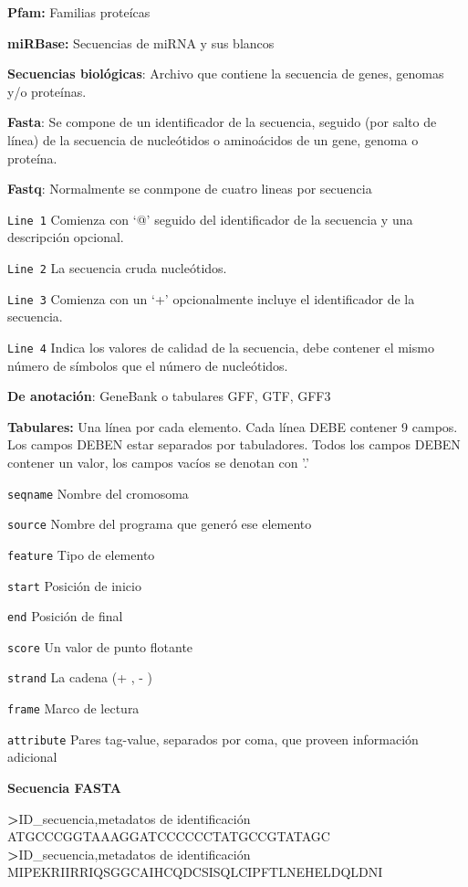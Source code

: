 \documentclass[
]{book}
\newenvironment{Shaded}{\begin{snugshade}}{\end{snugshade}}
\newcommand{\ExtensionTok}[1]{#1}
\newcommand{\NormalTok}[1]{#1}
\newcommand{\OperatorTok}[1]{\textcolor[rgb]{0.81,0.36,0.00}{\textbf{#1}}}
\begin{document}
\textbf{Pfam:} Familias proteícas

\textbf{miRBase:} Secuencias de miRNA y sus blancos

\textbf{Secuencias biológicas}: Archivo que contiene la secuencia de genes, genomas y/o proteínas.

\textbf{Fasta}: Se compone de un identificador de la secuencia, seguido (por salto de línea) de la
secuencia de nucleótidos o aminoácidos de un gene, genoma o proteína.

\textbf{Fastq}: Normalmente se conmpone de cuatro lineas por secuencia

\texttt{Line\ 1} Comienza con `@' seguido del identificador de la secuencia y una descripción opcional.

\texttt{Line\ 2} La secuencia cruda nucleótidos.

\texttt{Line\ 3} Comienza con un `+' opcionalmente incluye el identificador de la secuencia.

\texttt{Line\ 4} Indica los valores de calidad de la secuencia, debe contener el mismo número de símbolos que el número de nucleótidos.

\textbf{De anotación}: GeneBank o tabulares GFF, GTF, GFF3

\textbf{Tabulares:} Una línea por cada elemento. Cada línea DEBE contener 9 campos. Los campos DEBEN estar separados por tabuladores. Todos los campos DEBEN contener un valor, los campos vacíos se denotan con '.'

\texttt{seqname} Nombre del cromosoma

\texttt{source} Nombre del programa que generó ese elemento

\texttt{feature} Tipo de elemento

\texttt{start} Posición de inicio

\texttt{end} Posición de final

\texttt{score} Un valor de punto flotante

\texttt{strand} La cadena (+ , - )

\texttt{frame} Marco de lectura

\texttt{attribute} Pares tag-value, separados por coma, que proveen información
adicional

\textbf{Secuencia FASTA}

\begin{Shaded}
\begin{Highlighting}[]
\OperatorTok{\textgreater{}}\NormalTok{ID\_secuencia,metadatos }\ExtensionTok{de}\NormalTok{ identificación}
\ExtensionTok{ATGCCCGGTAAAGGATCCCCCCTATGCCGTATAGC}
\OperatorTok{\textgreater{}}\NormalTok{ID\_secuencia,metadatos }\ExtensionTok{de}\NormalTok{ identificación}
\ExtensionTok{MIPEKRIIRRIQSGGCAIHCQDCSISQLCIPFTLNEHELDQLDNI}
\end{Highlighting}
\end{Shaded}
\end{document}
